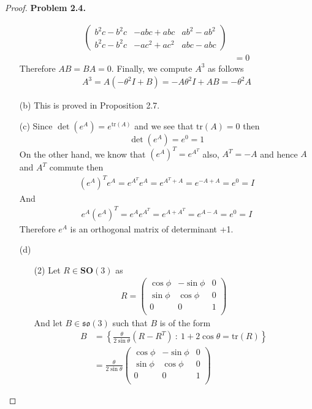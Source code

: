 \documentclass[11pt]{article}
\newcommand{\tr}{\text{tr}}
\theoremstyle{definition}
\begin{document}
\begin{proof}{\textbf{Problem 2.4.}}
\begin{itemize}
\begin{align*}
\begin{pmatrix}
            b^2c - b^2c & -abc + abc & ab^2 - ab^2\\
            b^2c - b^2c & -ac^2 + ac^2 & abc - abc
        \end{pmatrix}\\
        &= 0
    \end{align*}
    Therefore $AB = BA = 0$. Finally, we compute $A^3$ as follows
    \begin{align*}
        A^3 = A(-\theta^2I + B) = -A\theta^2I + AB = -\theta^2A
    \end{align*}
    \item [(b)] This is proved in Proposition 2.7.
    \item [(c)] Since $\det(e^A) = e^{\text{tr}(A)}$ and we see that
    $\text{tr}(A) = 0$ then
    $$\det(e^A) = e^0 = 1$$
    On the other hand, we know that $(e^A)^T = e^{A^T}$ also, $A^T = -A$ and 
    hence $A$ and $A^T$ commute then
    \begin{align*}
        (e^A)^T e^A = e^{A^T} e^A = e^{A^T + A} = e^{-A + A} = e^0 = I
    \end{align*}
    And 
    \begin{align*}
        e^A(e^A)^T = e^Ae^{A^T} = e^{A + A^T} = e^{A - A} = e^0 = I
    \end{align*}
    Therefore $e^A$ is an orthogonal matrix of determinant +1.
    \item [(d)]
    \begin{itemize}
    \item [(2)] Let $R \in \mathbf{SO}(3)$ as
    \begin{align*}
        R = \begin{pmatrix}
            \cos\phi & -\sin\phi & 0 \\
            \sin\phi & \cos\phi & 0 \\
            0 & 0 & 1 \\
        \end{pmatrix}
    \end{align*}
    And let $B \in \mathfrak{so}(3)$
    such that $B$ is of the form
    \begin{align*}
        B &= \left\{\frac{\theta}{2\sin\theta}(R - R^T)
        ~:~1 + 2 \cos\theta = \tr(R)\right\}\\
        &= \frac{\theta}{2\sin\theta}
         \begin{pmatrix}
            \cos\phi & -\sin\phi & 0 \\
            \sin\phi & \cos\phi & 0 \\
            0 & 0 & 1 \\

\end{pmatrix}
\end{align*}
\end{itemize}
\end{itemize}
\end{proof}
\end{document}

